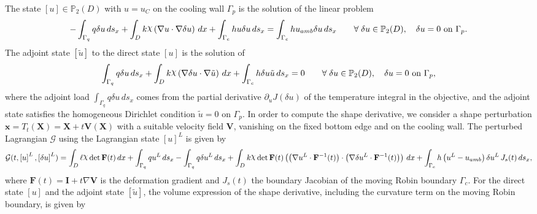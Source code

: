 \documentclass[preview]{standalone}
\let\oldcdot\cdot
\let\cdot\oldcdot
\begin{document}
The state $\left[ u\right] \in \mathbb P_{2}(D)$ with $u = u_C$ on the cooling wall $\Gamma_p$ is the solution of the linear problem
\begin{dmath*}
-  \int_{\Gamma_q} q \delta u \,ds_x +  \int_{D} k \raisebox{\depth}{$\chi$} \left(  \nabla u  \cdot  \nabla \delta u  \right) \,dx + \int_{\Gamma_c} h u \delta u \,ds_x = \int_{\Gamma_c} h u_{amb} \delta u \,ds_x \qquad \forall\; {\delta u\in \mathbb P_{2}(D)}, \quad \delta u = 0 \ \text{on } \Gamma_p .
\end{dmath*}
The adjoint state $\left[ \tilde u\right]$ to the direct state $\left[ u\right]$ is the solution of
\begin{dmath*}
\int_{\Gamma_q} q \delta u \,ds_x +  \int_{D} k \raisebox{\depth}{$\chi$} \left(  \nabla \delta u  \cdot  \nabla \tilde u  \right) \,dx + \int_{\Gamma_c} h \delta u \tilde u \,ds_x = 0\qquad \forall\; {\delta u\in \mathbb P_{2}(D)}, \quad \delta u = 0 \ \text{on } \Gamma_p ,
\end{dmath*}
where the adjoint load $\int_{\Gamma_q} q \delta u \,ds_x$ comes from the partial derivative $\partial_{u} J(\delta u)$ of the temperature integral in the objective, and the adjoint state satisfies the homogeneous Dirichlet condition $\tilde u = 0$ on $\Gamma_p$.
In order to compute the shape derivative, we consider a shape perturbation $\mathbf x = T_t(\mathbf X) = \mathbf X + t \mathbf  V(\mathbf X)$ with a suitable velocity field $\mathbf V$, vanishing on the fixed bottom edge and on the cooling wall.  The perturbed Lagrangian $\mathcal G$ using the Lagrangian state $\left[ u\right]^{L}$ is given by
\begin{dmath*}
\mathcal G(t,\left[ u\right]^{L},\left[ \delta u\right]^{L}) = \int_{D} \ell \raisebox{\depth}{$\chi$}  \operatorname{det}\mathbf F( t )  \,dx + \int_{\Gamma_q} q u^{L} \,ds_x -  \int_{\Gamma_q} q  \delta u^{L} \,ds_x +  \int_{D} k \raisebox{\depth}{$\chi$}  \operatorname{det}\mathbf F( t )  \left( \left(  \nabla u^{L} \cdot  \mathbf F^{-1}(t) \right) \cdot \left(  \nabla \delta u^{L} \cdot  \mathbf F^{-1}(t) \right) \right) \,dx + \int_{\Gamma_c} h \left( u^{L} - u_{amb}\right) \delta u^{L} \,J_{s}(t) \,ds_x ,
\end{dmath*}
where $\mathbf F(t) = \mathbf I + t \nabla \mathbf V$ is the deformation gradient and $J_{s}(t)$ the boundary Jacobian of the moving Robin boundary $\Gamma_c$.
For the direct state $\left[ u\right]$ and the adjoint state $\left[ \tilde u\right]$, the volume expression of the shape derivative, including the curvature term on the moving Robin boundary, is given by
\end{document}
